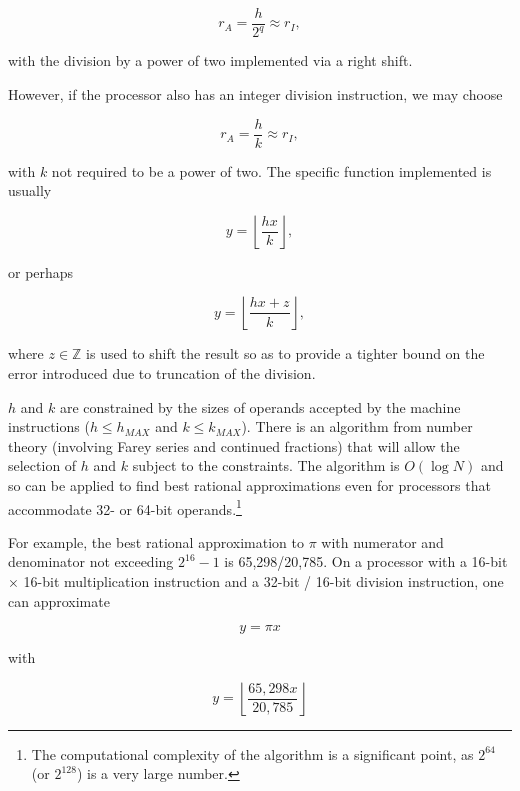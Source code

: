 \documentclass[letterpaper,10pt,titlepage]{article}
\begin{document}
\begin{equation}
r_A = \frac{h}{2^q} \approx r_I,
\end{equation} 

\noindent{}with the division by a power of two implemented via a right shift.

However, if the processor also has an integer division instruction, we may choose

\begin{equation}
r_A = \frac{h}{k} \approx r_I,
\end{equation} 

\noindent{}with $k$ not required to be a power of two.  The specific function
implemented is usually

\begin{equation}
y = \left\lfloor \frac{hx}{k} \right\rfloor ,
\end{equation} 

\noindent{}or perhaps

\begin{equation}
y = \left\lfloor \frac{hx + z}{k} \right\rfloor ,
\end{equation} 

\noindent{}where $z \in \mathbb{Z}$ is used to shift the result so as to
provide a tighter bound on the error introduced due to truncation of the
division.

$h$ and $k$ are constrained by the sizes of operands accepted by the 
machine instructions ($h \leq h_{MAX}$ and $k \leq k_{MAX}$).
There is an algorithm from number theory (involving Farey series and
continued fractions) that will allow the selection of $h$ and $k$ subject
to the constraints.  The algorithm is $O(\log N)$ and so can be applied
to find best rational approximations even for processors that accommodate
32- or 64-bit operands.\footnote{The computational complexity of the algorithm is
a significant point, as $2^{64}$ (or $2^{128}$) is a very large number.} 

For example, the best rational approximation to $\pi$ with
numerator and denominator not exceeding $2^{16}-1$ is 65,298/20,785\@.
On a processor with a 16-bit $\times$ 16-bit multiplication instruction and a
32-bit / 16-bit division instruction, one can approximate

\begin{equation}
y = \pi x
\end{equation}

\noindent{}with

\begin{equation}
y = \left\lfloor \frac{65,\!298 x}{20,\!785} \right\rfloor
\end{equation}
\end{document}
